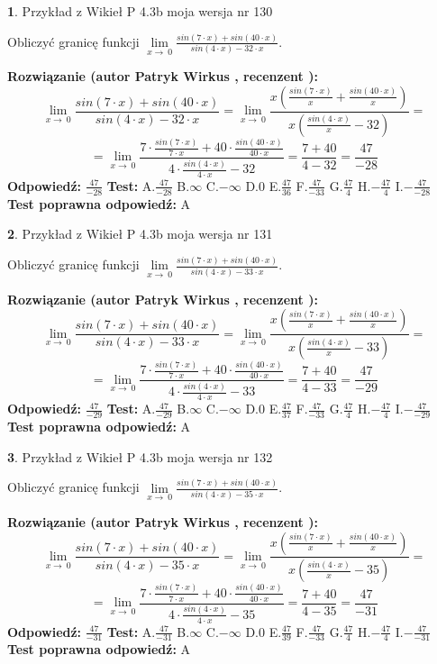 \documentclass[12pt, a4paper]{article}
\theoremstyle{definition} %
\newtheorem{zad}{}
\newcommand{\zadStart}[1]{\begin{zad}#1\newline}
\newcommand{\zadStop}{\end{zad}}
\newcommand{\rozwStart}[2]{\noindent \textbf{Rozwiązanie (autor #1 , recenzent #2): }\newline}
\newcommand{\rozwStop}{\newline}
\newcommand{\odpStart}{\noindent \textbf{Odpowiedź:}\newline}
\newcommand{\odpStop}{\newline}
\newcommand{\testStart}{\noindent \textbf{Test:}\newline}
\newcommand{\testStop}{\newline}
\newcommand{\kluczStart}{\noindent \textbf{Test poprawna odpowiedź:}\newline}
\newcommand{\kluczStop}{\newline}
\begin{document}
\zadStart{Przykład z Wikieł P 4.3b moja wersja nr 130}


Obliczyć granicę funkcji $\lim\limits_{x\to\ 0}\frac{sin(7 \cdot x)+sin(40 \cdot x)}{sin(4 \cdot x)-32 \cdot x}$.
\zadStop
\rozwStart{Patryk Wirkus}{}
$$\lim\limits_{x\to\ 0}\frac{sin(7 \cdot x)+sin(40 \cdot x)}{sin(4 \cdot x)-32 \cdot x}=\lim\limits_{x\to\ 0}\frac{x(\frac{sin(7 \cdot x)}{x}+\frac{sin(40 \cdot x)}{x})}{x(\frac{sin(4 \cdot x)}{x}-32)}=$$
$$=\lim\limits_{x\to\ 0}\frac{7 \cdot \frac{sin(7 \cdot x)}{7 \cdot x}+40 \cdot \frac{sin(40 \cdot x)}{40 \cdot x}}{4 \cdot \frac{sin(4 \cdot x)}{4 \cdot x}-32}=\frac{7+40}{4-32} = \frac{47}{-28}$$
\rozwStop
\odpStart
$\frac{47}{-28}$
\odpStop
\testStart
A.$\frac{47}{-28}$
B.$\infty$
C.$-\infty$
D.$0$
E.$\frac{47}{36}$
F.$\frac{47}{-33}$
G.$\frac{47}{4}$
H.$-\frac{47}{4}$
I.$-\frac{47}{-28}$
\testStop
\kluczStart
A
\kluczStop



\zadStart{Przykład z Wikieł P 4.3b moja wersja nr 131}


Obliczyć granicę funkcji $\lim\limits_{x\to\ 0}\frac{sin(7 \cdot x)+sin(40 \cdot x)}{sin(4 \cdot x)-33 \cdot x}$.
\zadStop
\rozwStart{Patryk Wirkus}{}
$$\lim\limits_{x\to\ 0}\frac{sin(7 \cdot x)+sin(40 \cdot x)}{sin(4 \cdot x)-33 \cdot x}=\lim\limits_{x\to\ 0}\frac{x(\frac{sin(7 \cdot x)}{x}+\frac{sin(40 \cdot x)}{x})}{x(\frac{sin(4 \cdot x)}{x}-33)}=$$
$$=\lim\limits_{x\to\ 0}\frac{7 \cdot \frac{sin(7 \cdot x)}{7 \cdot x}+40 \cdot \frac{sin(40 \cdot x)}{40 \cdot x}}{4 \cdot \frac{sin(4 \cdot x)}{4 \cdot x}-33}=\frac{7+40}{4-33} = \frac{47}{-29}$$
\rozwStop
\odpStart
$\frac{47}{-29}$
\odpStop
\testStart
A.$\frac{47}{-29}$
B.$\infty$
C.$-\infty$
D.$0$
E.$\frac{47}{37}$
F.$\frac{47}{-33}$
G.$\frac{47}{4}$
H.$-\frac{47}{4}$
I.$-\frac{47}{-29}$
\testStop
\kluczStart
A
\kluczStop



\zadStart{Przykład z Wikieł P 4.3b moja wersja nr 132}


Obliczyć granicę funkcji $\lim\limits_{x\to\ 0}\frac{sin(7 \cdot x)+sin(40 \cdot x)}{sin(4 \cdot x)-35 \cdot x}$.
\zadStop
\rozwStart{Patryk Wirkus}{}
$$\lim\limits_{x\to\ 0}\frac{sin(7 \cdot x)+sin(40 \cdot x)}{sin(4 \cdot x)-35 \cdot x}=\lim\limits_{x\to\ 0}\frac{x(\frac{sin(7 \cdot x)}{x}+\frac{sin(40 \cdot x)}{x})}{x(\frac{sin(4 \cdot x)}{x}-35)}=$$
$$=\lim\limits_{x\to\ 0}\frac{7 \cdot \frac{sin(7 \cdot x)}{7 \cdot x}+40 \cdot \frac{sin(40 \cdot x)}{40 \cdot x}}{4 \cdot \frac{sin(4 \cdot x)}{4 \cdot x}-35}=\frac{7+40}{4-35} = \frac{47}{-31}$$
\rozwStop
\odpStart
$\frac{47}{-31}$
\odpStop
\testStart
A.$\frac{47}{-31}$
B.$\infty$
C.$-\infty$
D.$0$
E.$\frac{47}{39}$
F.$\frac{47}{-33}$
G.$\frac{47}{4}$
H.$-\frac{47}{4}$
I.$-\frac{47}{-31}$
\testStop
\kluczStart
A
\kluczStop
\end{document}
